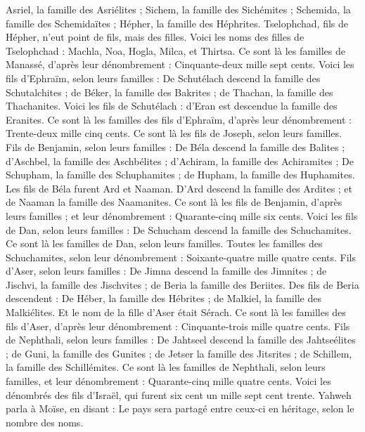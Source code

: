 \begin{multicols}{2}
Asriel, la famille des Asriélites ; Sichem, la famille des Sichémites ;
Schemida, la famille des Schemidaïtes ; Hépher, la famille des Héphrites.
Tselophchad, fils de Hépher, n'eut point de fils, mais des filles. Voici les noms des filles de Tselophchad : Machla, Noa, Hogla, Milca, et Thirtsa.
Ce sont là les familles de Manassé, d'après leur dénombrement : Cinquante-deux mille sept cents.
Voici les fils d'Ephraïm, selon leurs familles : De Schutélach descend la famille des Schutalchites ; de Béker, la famille des Bakrites ; de Thachan, la famille des Thachanites.
Voici les fils de Schutélach : d'Eran est descendue la famille des Eranites.
Ce sont là les familles des fils d'Ephraïm, d'après leur dénombrement : Trente-deux mille cinq cents. Ce sont là les fils de Joseph, selon leurs familles.
Fils de Benjamin, selon leurs familles : De Béla descend la famille des Balites ; d'Aschbel, la famille des Aschbélites ; d'Achiram, la famille des Achiramites ;
De Schupham, la famille des Schuphamites ; de Hupham, la famille des Huphamites.
Les fils de Béla furent Ard et Naaman. D'Ard descend la famille des Ardites ; et de Naaman la famille des Naamanites.
Ce sont là les fils de Benjamin, d'après leurs familles ; et leur dénombrement : Quarante-cinq mille six cents.
Voici les fils de Dan, selon leurs familles : De Schucham descend la famille des Schuchamites. Ce sont là les familles de Dan, selon leurs familles.
Toutes les familles des Schuchamites, selon leur dénombrement : Soixante-quatre mille quatre cents.
Fils d'Aser, selon leurs familles : De Jimna descend la famille des Jimnites ; de Jischvi, la famille des Jischvites ; de Beria la famille des Beriites.
Des fils de Beria descendent : De Héber, la famille des Hébrites ; de Malkiel, la famille des Malkiélites.
Et le nom de la fille d'Aser était Sérach.
Ce sont là les familles des fils d'Aser, d'après leur dénombrement : Cinquante-trois mille quatre cents.
Fils de Nephthali, selon leurs familles : De Jahtseel descend la famille des Jahtseélites ; de Guni, la famille des Gunites ;
de Jetser la famille des Jitsrites ; de Schillem, la famille des Schillémites.
Ce sont là les familles de Nephthali, selon leurs familles, et leur dénombrement : Quarante-cinq mille quatre cents.
Voici les dénombrés des fils d'Israël, qui furent six cent un mille sept cent trente.
Yahweh parla à Moïse, en disant :
Le pays sera partagé entre ceux-ci en héritage, selon le nombre des noms.

\end{multicols}
